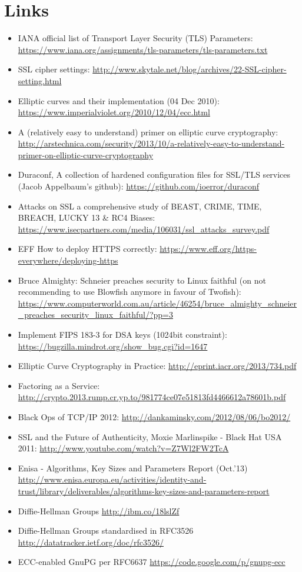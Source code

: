 \section{Links}
\label{section:Links}


\begin{itemize}
\item IANA official list of Transport Layer Security (TLS) Parameters: \url{https://www.iana.org/assignments/tls-parameters/tls-parameters.txt}
\item SSL cipher settings: \url{http://www.skytale.net/blog/archives/22-SSL-cipher-setting.html}
\item Elliptic curves and their implementation (04 Dec 2010): \url{https://www.imperialviolet.org/2010/12/04/ecc.html}
\item A (relatively easy to understand) primer on elliptic curve cryptography: \url{http://arstechnica.com/security/2013/10/a-relatively-easy-to-understand-primer-on-elliptic-curve-cryptography}
\item Duraconf, A collection of hardened configuration files for SSL/TLS services (Jacob Appelbaum's github): \url{https://github.com/ioerror/duraconf}
\item Attacks on SSL a comprehensive study of BEAST, CRIME, TIME, BREACH, LUCKY 13 \& RC4 Biases: \url{https://www.isecpartners.com/media/106031/ssl_attacks_survey.pdf}
\item EFF How to deploy HTTPS correctly: \url{https://www.eff.org/https-everywhere/deploying-https}
\item Bruce Almighty: Schneier preaches security to Linux faithful (on not recommending to use Blowfish anymore in favour of Twofish): \url{https://www.computerworld.com.au/article/46254/bruce_almighty_schneier_preaches_security_linux_faithful/?pp=3}
\item Implement FIPS 183-3 for DSA keys (1024bit constraint): \url{https://bugzilla.mindrot.org/show_bug.cgi?id=1647}
\item Elliptic Curve Cryptography in Practice: \url{http://eprint.iacr.org/2013/734.pdf}
\item Factoring as a Service: \url{http://crypto.2013.rump.cr.yp.to/981774ce07e51813fd4466612a78601b.pdf}
\item Black Ops of TCP/IP 2012: \url{http://dankaminsky.com/2012/08/06/bo2012/}
\item SSL and the Future of Authenticity, Moxie Marlinspike - Black Hat USA 2011: \url{http://www.youtube.com/watch?v=Z7Wl2FW2TcA}
\item Enisa - Algorithms, Key Sizes and Parameters Report (Oct.'13) \url{http://www.enisa.europa.eu/activities/identity-and-trust/library/deliverables/algorithms-key-sizes-and-parameters-report}
\item Diffie-Hellman Groups \url{http://ibm.co/18lslZf}
\item Diffie-Hellman Groups standardised in RFC3526 \cite{rfc3526} \url{http://datatracker.ietf.org/doc/rfc3526/}
\item ECC-enabled GnuPG per RFC6637 \url{https://code.google.com/p/gnupg-ecc}
\end{itemize}
